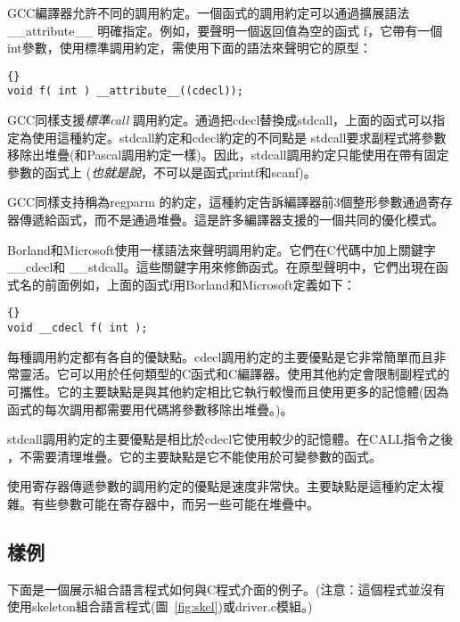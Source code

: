 GCC編譯器允許不同的調用約定。一個函式的調用約定可以通過擴展語法{\code
\_\_attribute\_\_}
明確指定。例如，要聲明一個返回值為空的函式{\code
f}，它帶有一個{\code
int}參數，使用標準調用約定，需使用下面的語法來聲明它的原型：
\begin{lstlisting}[stepnumber=0]{}
void f( int ) __attribute__((cdecl));
\end{lstlisting}
GCC同樣支援\emph{標準call} 調用約定。通過把{\code cdecl}替換成{\code stdcall}，上面的函式可以指定為使用這種約定。{\code stdcall}約定和{\code cdecl}約定的不同點是
{\code stdcall}要求副程式將參數移除出堆疊(和Pascal調用約定一樣)。因此，{\code stdcall}調用約定只能使用在帶有固定參數的函式上 (\emph{也就是說}，不可以是函式{\code printf}和{\code scanf})。

GCC同樣支持稱為{\code regparm}
的約定，這種約定告訴編譯器前3個整形參數通過寄存器傳遞給函式，而不是通過堆疊。這是許多編譯器支援的一個共同的優化模式。

Borland和Microsoft使用一樣語法來聲明調用約定。它們在C代碼中加上關鍵字{\code \_\_cdecl}和 {\code \_\_stdcall}。這些關鍵字用來修飾函式。在原型聲明中，它們出現在函式名的前面例如，上面的函式{\code f}用Borland和Microsoft定義如下：
\begin{lstlisting}[stepnumber=0]{}
void __cdecl f( int );
\end{lstlisting}

每種調用約定都有各自的優缺點。{\code cdecl}調用約定的主要優點是它非常簡單而且非常靈活。它可以用於任何類型的C函式和C編譯器。使用其他約定會限制副程式的可攜性。它的主要缺點是與其他約定相比它執行較慢而且使用更多的記憶體(因為函式的每次調用都需要用代碼將參數移除出堆疊。)。

{\code stdcall}調用約定的主要優點是相比於{\code cdecl}它使用較少的記憶體。在{\code CALL}指令之後 ，不需要清理堆疊。它的主要缺點是它不能使用於可變參數的函式。

使用寄存器傳遞參數的調用約定的優點是速度非常快。主要缺點是這種約定太複雜。有些參數可能在寄存器中，而另一些可能在堆疊中。


\subsection{樣例}

下面是一個展示組合語言程式如何與C程式介面的例子。(注意：這個程式並沒有使用skeleton組合語言程式(圖~\ref{fig:skel})或driver.c模組。)

